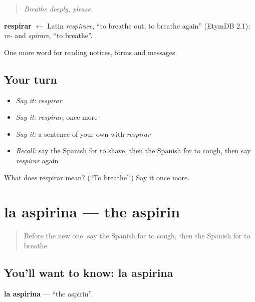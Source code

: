 \begin{quote}
\emph{Breathe deeply, please.}
\end{quote}

\begin{cousinweb}
\textbf{respirar} $\leftarrow$ Latin \emph{respirare}, \textquotedblleft{}to breathe out, to breathe again\textquotedblright{} (EtymDB 2.1): \emph{re-} and \emph{spirare}, \textquotedblleft{}to breathe\textquotedblright{}.
\end{cousinweb}

\begin{grammarlens}[title={What you've built}]
One more word for reading notices, forms and messages.
\end{grammarlens}

\subsection*{Your turn}
\begin{itemize}
\raggedright
  \item \emph{Say it:} \emph{respirar}
  \item \emph{Say it:} \emph{respirar}, once more
  \item \emph{Say it:} a sentence of your own with \emph{respirar}
  \item \emph{Recall:} say the Spanish for to shave, then the Spanish for to cough, then say \emph{respirar} again
\end{itemize}

\begin{tcolorbox}[breakable,colback=teal!4,colframe=teal!35!black,title={Before you move on}]
What does respirar mean? (\textquotedblleft{}To breathe\textquotedblright{}.) Say it once more.
\end{tcolorbox}
\section[la aspirina]{la aspirina — the aspirin}

\label{lesson:ES-C486-aspirina}



\begin{quote}
Before the new one: say the Spanish for to cough, then the Spanish for to breathe.
\end{quote}

\subsection*{You'll want to know: la aspirina}
\textbf{la aspirina} — \textquotedblleft{}the aspirin\textquotedblright{}.

